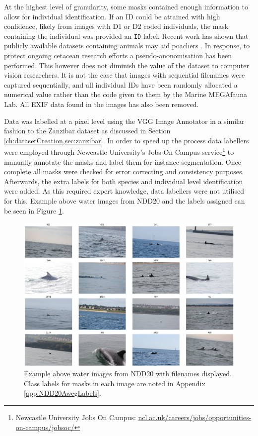 At the highest level of granularity, some masks contained enough information to allow for individual identification. If an ID could be attained with high confidence, likely from images with D1 or D2 coded individuals, the mask containing the individual was provided an \texttt{ID} label. Recent work has shown that publicly available datasets containing animals may aid poachers \cite{beery_can_2021}. In response, to protect ongoing cetacean research efforts a pseudo-anonomisation has been performed. This however does not diminish the value of the dataset to computer vision researchers. It is not the case that images with sequential filenames were captured sequentially, and all individual IDs have been randomly allocated a numerical value rather than the code given to them by the Marine MEGAfauna Lab. All EXIF data found in the images has also been removed.

Data was labelled at a pixel level using the VGG Image Annotator \cite{dutta_via_2019} in a similar fashion to the Zanzibar dataset as discussed in Section \ref{ch:datasetCreation,sec:zanzibar}. In order to speed up the process data labellers were employed through Newcastle University's Jobs On Campus service\footnote{Newcastle University Jobs On Campus: \href{https://www.ncl.ac.uk/careers/jobs/opportunities-on-campus/jobsoc/\#jobsocoverview}{ncl.ac.uk/careers/jobs/opportunities-on-campus/jobsoc/}} to manually annotate the masks and label them for instance segmentation. Once complete all masks were checked for error correcting and consistency purposes. Afterwards, the extra labels for both species and individual level identification were added. As this required expert knowledge, data labellers were not utilised for this. Example above water images from NDD20 and the labels assigned can be seen in Figure \ref{fig:above-water-example}.

\begin{figure}
	\begin{center}
		\includegraphics[scale=0.3]{Chapter3/figs/aweg-tiled.png}
	\end{center}
	\caption[Example above water images from NDD20 with filenames displayed.]{Example above water images from NDD20 with filenames displayed. Class labels for masks in each image are noted in Appendix \ref{app:NDD20AwegLabels}.}
	\label{fig:above-water-example}
\end{figure}

